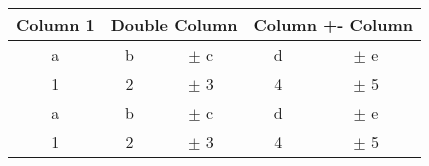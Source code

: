 \begin{tabularx}{0.5\linewidth}{|c|cc|cc|}
    \arrayrulecolor{white}
    \hline
    \rowcolor{ATLASBlue}\color{white}\bfseries{Column 1} & \multicolumn{2}{c|}{\color{white}\bfseries{Double Column}} & \multicolumn{2}{c|}{\color{white}\bfseries{Column +- Column}} \\
    \hline 
    \rowcolor{ATLASBlue_lightest} a & b & $\pm$ c & d & $\pm$ e \\
	\rowcolor{ATLASBlue_lighter} 1 & 2 & $\pm$ 3 & 4 & $\pm$ 5 \\
	\rowcolor{ATLASBlue_lightest} a & b & $\pm$ c & d & $\pm$ e \\
	\rowcolor{ATLASBlue_lighter} 1 & 2 & $\pm$ 3 & 4 & $\pm$ 5 \\

    \hline 
\end{tabularx} \\


